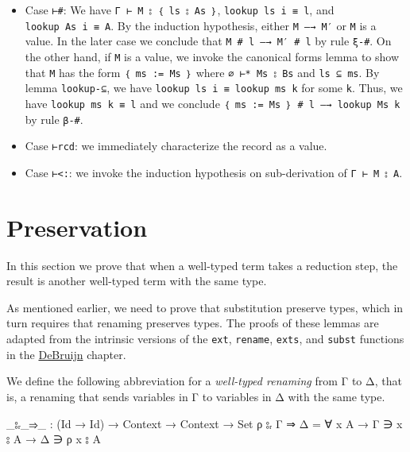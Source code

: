 \begin{itemize}
\item
  Case \texttt{⊢\#}: We have \texttt{Γ\ ⊢\ M\ ⦂\ ｛\ ls\ ⦂\ As\ ｝},
  \texttt{lookup\ ls\ i\ ≡\ l}, and \texttt{lookup\ As\ i\ ≡\ A}. By the
  induction hypothesis, either \texttt{M\ —→\ M′} or \texttt{M} is a
  value. In the later case we conclude that
  \texttt{M\ \#\ l\ —→\ M′\ \#\ l} by rule \texttt{ξ-\#}. On the other
  hand, if \texttt{M} is a value, we invoke the canonical forms lemma to
  show that \texttt{M} has the form \texttt{｛\ ms\ :=\ Ms\ ｝} where
  \texttt{∅\ ⊢*\ Ms\ ⦂\ Bs} and \texttt{ls\ ⊆\ ms}. By lemma
  \texttt{lookup-⊆}, we have \texttt{lookup\ ls\ i\ ≡\ lookup\ ms\ k}
  for some \texttt{k}. Thus, we have \texttt{lookup\ ms\ k\ ≡\ l} and we
  conclude \texttt{｛\ ms\ :=\ Ms\ ｝\ \#\ l\ —→\ lookup\ Ms\ k} by rule
  \texttt{β-\#}.
\item
  Case \texttt{⊢rcd}: we immediately characterize the record as a value.
\item
  Case \texttt{⊢\textless{}:}: we invoke the induction hypothesis on
  sub-derivation of \texttt{Γ\ ⊢\ M\ ⦂\ A}.
\end{itemize}

\hypertarget{preservation}{%
\section{\texorpdfstring{Preservation
}{Preservation }}\label{preservation}}

In this section we prove that when a well-typed term takes a reduction
step, the result is another well-typed term with the same type.

As mentioned earlier, we need to prove that substitution preserve types,
which in turn requires that renaming preserves types. The proofs of
these lemmas are adapted from the intrinsic versions of the
\texttt{ext}, \texttt{rename}, \texttt{exts}, and \texttt{subst}
functions in the \protect\hyperlink{DeBruijn}{DeBruijn} chapter.

We define the following abbreviation for a \emph{well-typed renaming}
from Γ to Δ, that is, a renaming that sends variables in Γ to variables
in Δ with the same type.

\begin{fence}
\begin{code}
_⦂ᵣ_⇒_ : (Id → Id) → Context → Context → Set
ρ ⦂ᵣ Γ ⇒ Δ = ∀ {x A} → Γ ∋ x ⦂ A → Δ ∋ ρ x ⦂ A
\end{code}
\end{fence}


